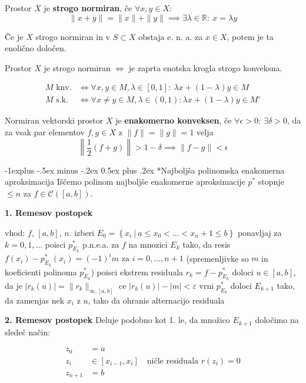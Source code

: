 \documentclass[a3paper,8pt]{extarticle}
\makeatletter
\renewcommand{\subsection}{\@startsection{subsection}{2}{0mm}%
                                {-1explus -.5ex minus -.2ex}%
                                {0.5ex plus .2ex}%
                                {\normalfont\normalsize\bfseries}}
\makeatother
\begin{document}
\begin{multicols}{5}
Prostor $X$ je \textbf{strogo normiran}, če $\forall x, y \in X$:
\[ \| x + y \| = \| x \| + \| y \| \implies \exists \lambda \in \mathbb{R} : \ x = \lambda y  \]

Če je $X$ strogo normiran in v $S \subset X$ obstaja e. n. a. za $x \in X$, potem je ta enolično določen.


Prostor $X$ je strogo normiran $\iff$ je zaprta enotska krogla strogo konveksna.

\begin{align*}
	M \text{ knv.} &\iff \forall x, y \in M, \lambda \in [0, 1] : \ \lambda x + (1-\lambda) y \in M \\
	M \text{ s.k. } &\iff \forall x \neq y \in M, \lambda \in (0, 1) : \lambda x + (1-\lambda) y \in M^\circ
\end{align*}

Normiran vektorski prostor $X$ je \textbf{enakomerno konveksen}, če $\forall \epsilon > 0 : \ \exists \delta > 0$, da za vsak par elementov $f, g \in X$ z $\| f \| = \| g \| = 1$ velja
\[ \left\| \frac{1}{2} (f+g) \right\| > 1 - \delta \implies \| f-g \| < \epsilon \]

\subsection*{Najboljša polinomska enakomerna aproksimacija}
Iščemo polinom najboljše enakomerne aproksimacije $p^*$ stopnje $\leq n$ za $f \in \mathcal{C}([a, b])$. 

\textbf{1. Remesov postopek} 

\begin{koda}
vhod: $f$, $[a, b]$, $n$.
izberi $E_0 = \left\{ x_i\ |\ a \leq x_0 < \dots < x_n+1 \leq b \right\}$
ponavljaj za $k = 0, 1, \dots$
	poisci $p_{E_k}^*$ p.n.e.a. $\text{za}$ $f$ na mnozici $E_k$ tako, da resis 
		$f(x_i) - p_{E_k}^*(x_i) = (-1)^i m$  $\text{za } i = 0, \dots, n+1$
		(spremenljivke so $m$ in koeficienti polinoma $p_{E_k}^*$)
	poisci ekstrem residuala $r_k = f - p_{E_k}^*$
	doloci $u \in [a, b]$, da je $| r_k(u) | = \| r_k \|_{\infty, [a, b]}$
	ce $| r_k(u) | - |m| < \varepsilon$
		vrni $p_{E_k}^*$ 
	doloci $E_{k+1}$ tako, da zamenjas nek $x_i$ z $u$, tako da 
	ohranis alternacijo residuala 
\end{koda}

\textbf{2. Remesov postopek}
Deluje podobno kot 1. le, da množico $E_{k+1}$ določimo na sledeč način:

\begin{align*}
	z_0 &= a \\
	z_i &\in [x_{i-1}, x_i]  \quad \text{ničle residuala } r(z_i) = 0 \\
	z_{n+1} &= b \\
\end{align*}


\end{multicols}
\end{document}
